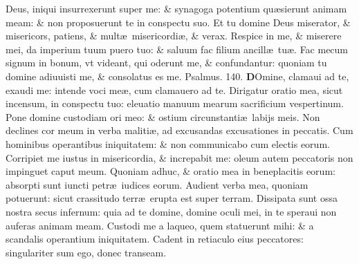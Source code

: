 \documentclass[a5paper,10pt]{book}
\def\ae{æ}
\begin{document}
\begin{multicols*}{2}
\newline \color{red} D\color{black}eus, iniqui insurrexerunt super me: \& synagoga potentium qu\ae sierunt animam meam: \& non proposuerunt te in conspectu suo.
\newline \color{red} E\color{black}t tu domine Deus miserator, \& misericors, patiens, \& mult\ae \ misericordi\ae , \& verax.
\newline \color{red} R\color{black}espice in me, \& miserere mei, da imperium tuum puero tuo: \& saluum fac filium ancill\ae \ tu\ae .
\newline \color{red} F\color{black}ac mecum signum in bonum, vt videant, qui oderunt me, \& confundantur: quoniam tu domine adiuuisti me, \& consolatus es me. \quad \color{red} Psalmus. 140. \color{black}
\vspace{-.5em}
\lettrine[lines=2]{\bfseries \color{red} D}{}Omine, clamaui ad te, exaudi me: intende voci me\ae , cum clamauero ad te.
\newline \color{red} D\color{black}irigatur oratio mea, sicut incensum, in conspectu tuo: eleuatio manuum mearum sacrificium vespertinum.
\newline \color{red} P\color{black}one domine custodiam ori meo: \& ostium circunstanti\ae \ labijs meis.
\newline \color{red} N\color{black}on declines cor meum in verba maliti\ae , ad excusandas excusationes in peccatis.
\newline \color{red} C\color{black}um hominibus operantibus iniquitatem: \& non communicabo cum electis eorum.
\newline \color{red} C\color{black}orripiet me iustus in misericordia, \& increpabit me: oleum autem peccatoris non impinguet caput meum.
\newline \color{red} Q\color{black}uoniam adhuc, \& oratio mea in beneplacitis eorum: absorpti sunt iuncti petr\ae \ iudices eorum.
\newline \color{red} A\color{black}udient verba mea, quoniam potuerunt: sicut crassitudo terr\ae \ erupta est super terram.
\newline \color{red} D\color{black}issipata sunt ossa nostra secus infernum: quia ad te domine, domine oculi mei, in te speraui non auferas animam meam.
\newline \color{red} C\color{black}ustodi me a laqueo, quem statuerunt mihi: \& a scandalis operantium iniquitatem.
\newline \color{red} C\color{black}adent in retiaculo eius peccatores: singulariter sum ego, donec transeam.

\end{multicols*}
\end{document}
